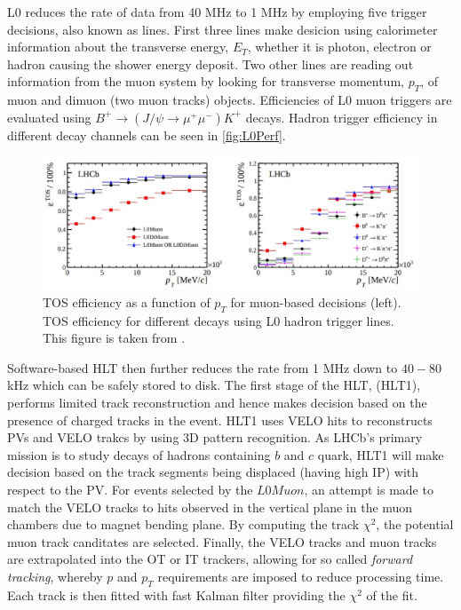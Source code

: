 \Gls{L0} reduces the rate of data from 40 MHz to 1 MHz by employing five trigger decisions, also known as lines. First three lines make desicion using calorimeter information about the transverse energy, $E_{T}$, whether it is photon, electron or hadron causing the shower energy deposit. Two other lines are reading out information from the muon system by looking for transverse momentum, $p_{T}$, of muon and dimuon (two muon tracks) objects. Efficiencies of L0 muon triggers are evaluated using $B^{+} \rightarrow (J/\psi \rightarrow \mu^{+} \mu^{-}) K^{+}$ decays. Hadron trigger efficiency in different decay channels can be seen in \autoref{fig:L0Perf}. 


\begin{figure}[!h]
	\centering
	\includegraphics[width = 1.0\textwidth]{figs/detector/L0performance.eps}%
	\caption{ \Gls{TOS} efficiency as a function of $p_{T}$ for muon-based decisions (left).         \Gls{TOS} efficiency for different decays using L0 hadron trigger lines. This figure is taken from \cite{LHCb-DP-2012-002}. }  
	\label{fig:L0Perf}
\end{figure}


Software-based \Gls{HLT} then further reduces the rate from 1 MHz down to $40-80$ kHz which can be safely stored to disk. The first stage of the \Gls{HLT}, (\Gls{HLT1}), performs limited track reconstruction and hence makes decision based on the presence of charged tracks in the event. \Gls{HLT1} uses \Gls{VELO} hits to reconstructs \Gls{PV}s and \Gls{VELO} trakcs by using 3D pattern recognition. As \Gls{LHCb}'s primary mission is to study decays of hadrons containing $b$ and $c$ quark, \Gls{HLT1} will make decision based on the track segments being displaced (having high \Gls{IP}) with respect to the \Gls{PV}. For events selected by the $L0Muon$, an attempt is made to match the \Gls{VELO} tracks to hits observed in the vertical plane in the muon chambers due to magnet bending plane. By computing the track $\chi^2$, the potential muon track canditates are selected. Finally, the \Gls{VELO} tracks and muon tracks are extrapolated into the \Gls{OT} or \Gls{IT} trackers, allowing for so called \textit{forward tracking}, whereby $p$ and $p_{T}$ requirements are imposed to reduce processing time. Each track is then fitted with fast Kalman filter providing the $\chi^2$ of the fit.


